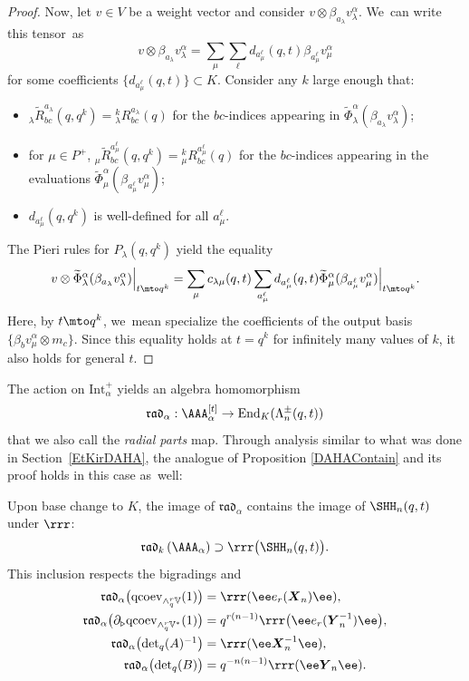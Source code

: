 \begin{proof}
Now, let $v\in V$ be a weight vector and consider $v\otimes\beta_{a_\lambda}v_\lambda^\alpha$. We~can write this tensor~as
\[
v\otimes\beta_{a_\lambda}v_\lambda^\alpha = \sum_{\mu}\sum_{\ell}d_{a_\mu^\ell}(q,t)\beta_{a_\mu^\ell}v_\mu^\alpha
\]
for some coefficients $\{d_{a_\mu^\ell}(q,t)\}\subset K$.
Consider any $k$ large enough that:
\begin{itemize}
\item ${}_\lambda\widetilde{R}_{bc}^{a_\lambda}(q,q^k)= {}_\lambda^kR_{bc}^{a_\lambda}(q)$ for the $bc$-indices appearing in $\widetilde{\Phi}_\lambda^\alpha(\beta_{a_\lambda}v_\lambda^\alpha)$;
\item for $\mu\in P^+$, ${}_\mu\widetilde{R}_{bc}^{a_\mu^\ell}(q,q^k)= {}_\mu^k R_{bc}^{a_\mu^\ell}(q)$ for the $bc$-indices appearing in the evaluations $\widetilde{\Phi}_\mu^\alpha(\beta_{a_\mu^\ell}v_\mu^\alpha)$;
\item $d_{a_\mu^\ell}(q,q^k)$ is well-defined for all $a_\mu^\ell$.
\end{itemize}
The Pieri rules for $P_\lambda(q,q^k)$ yield the equality
\[
v\otimes\widetilde{\Phi}_\lambda^\alpha(\beta_{a_\lambda}v_\lambda^\alpha)\Big|_{t\mto q^k}
=
\sum_{\mu} c_{\lambda\mu}(q,t)\sum_{a_\mu^\ell}d_{a_\mu^\ell}(q,t)\widetilde{\Phi}_\mu^\alpha(\beta_{a_\mu^\ell}v_\mu^\alpha)\Big|_{t\mto q^k}.
\]
Here, by $t\mto q^k$, we~mean specialize the coefficients of the output basis $\{\beta_b v_\mu^\alpha\otimes m_c\}$.
Since this equality holds at $t=q^k$ for infinitely many values of $k$, it also holds for general $t$.
\end{proof}

The action on $\mathrm{Int}_\alpha^+$ yields an algebra homomorphism
\[
\mathfrak{rad}_\alpha:\AAA^{[t]}_\alpha\to\mathrm{End}_K(\Lambda^\pm_n(q,t))
\]
that we also call the \textit{radial parts} map.
Through analysis similar to what was done in Section~\ref{EtKirDAHA}, the analogue of Proposition \ref{DAHAContain} and its proof holds in this case as~well:
\begin{prop}\label{tDAHAContain}
Upon base change to $K$, the image of $\mathfrak{rad}_\alpha$ contains the image of $\SHH_n(q,t)$ under $\rrr$:
\[
\mathfrak{rad}_k\left(\AAA_\alpha \right)\supset\rrr\bigl(\SHH_n(q,t) \bigr).
\]
This inclusion respects the bigradings and
\begin{equation*}
\begin{aligned}
\mathfrak{rad}_\alpha\bigl(\mathrm{qcoev}_{\wedge_q^r\mathbb{V}}(1) \bigr)&= \rrr(\ee e_r(\boldsymbol{X}_n)\ee),\\
\mathfrak{rad}_\alpha\bigl(\partial_\triangleright\mathrm{qcoev}_{\wedge_q^r\mathbb{V}^*}(1) \bigr)&= q^{r(n-1)}\rrr\bigl(\ee e_r(\boldsymbol{Y}^{-1}_n)\ee \bigr),\\
\mathfrak{rad}_\alpha\bigl(\textstyle\det_q(A)^{-1}\bigr)&= \rrr(\ee \boldsymbol{X}^{-1}_n\ee),\\
\mathfrak{rad}_\alpha\bigl(\textstyle\det_q(B)\bigr)&= q^{-n(n-1)}\rrr(\ee \boldsymbol{Y}_n\ee).
\end{aligned}
\end{equation*}
\end{prop}

